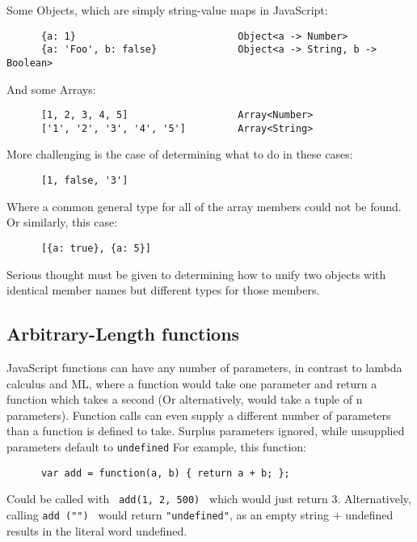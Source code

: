 \documentclass[british, twoside]{bhamthesis}
\theoremstyle{definition}
\begin{document}
    Some Objects, which are simply string-value maps in JavaScript:

    \begin{lstlisting}
      {a: 1}                            Object<a -> Number>
      {a: 'Foo', b: false}              Object<a -> String, b -> Boolean>
    \end{lstlisting}

    And some Arrays:

    \begin{lstlisting}
      [1, 2, 3, 4, 5]                   Array<Number>
      ['1', '2', '3', '4', '5']         Array<String>
    \end{lstlisting}

    More challenging is the case of determining what to do in these cases:

    \begin{lstlisting}
      [1, false, '3']
    \end{lstlisting}

    Where a common general type for all of the array members could not be found. Or similarly, this case:

    \begin{lstlisting}
      [{a: true}, {a: 5}]
    \end{lstlisting}

    Serious thought must be given to determining how to unify two objects with identical member names but different types for those members.

  \subsection{Arbitrary-Length functions}
    JavaScript functions can have any number of parameters, in contrast to lambda calculus and ML, where a function would take one parameter and return a function which takes a second (Or alternatively, would take a tuple of n parameters). Function calls can even supply a different number of parameters than a function is defined to take. Surplus parameters ignored, while unsupplied parameters default to \texttt {undefined} For example, this function:

    \begin{lstlisting}
      var add = function(a, b) { return a + b; };
    \end{lstlisting}

    Could be called with \texttt { add(1, 2, 500) } which would just return 3. Alternatively, calling \texttt {add ("") } would return \texttt {"undefined"}, as an empty string + undefined results in the literal word undefined.
\end{document}
